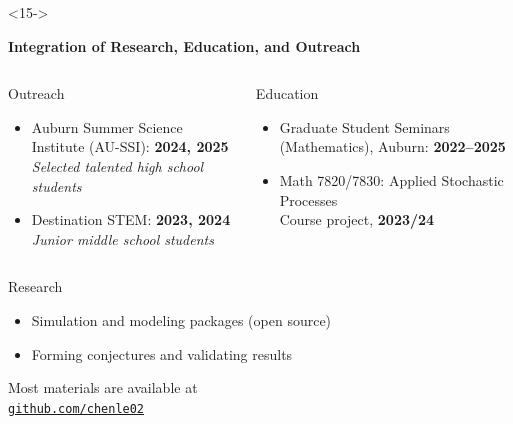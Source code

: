 \documentclass[9pt,table,xcolor=dvipsnames]{beamer}
\begin{document}
\begin{frame}[noframenumbering] %
  \titlepage
\end{frame}
\begin{frame}<15->%

  \begin{center}
    \textbf{Integration of Research, Education, and Outreach}
  \end{center}
  \vfill
  \small  %

  \begin{columns}[T,onlytextwidth]
    \begin{block}{Outreach}
      \begin{itemize}\itemsep4pt
        \item Auburn Summer Science Institute (AU-SSI): \textbf{2024, 2025} \\
              \emph{Selected talented high school students}
        \item Destination STEM: \textbf{2023, 2024}                         \\
              \emph{Junior middle school students}
      \end{itemize}
    \end{block}

    \begin{block}{Education}
      \begin{itemize}\itemsep2pt
        \item Graduate Student Seminars (Mathematics), Auburn: \textbf{2022--2025}
        \item Math 7820/7830: Applied Stochastic Processes \\
              Course project, \textbf{2023/24}
      \end{itemize}
    \end{block}

  \end{columns}
   \vfill 
   \begin{center}
      \begin{minipage}{0.35\textwidth}
        \begin{block}{Research}
          \begin{itemize}\itemsep2pt
            \item Simulation and modeling packages (open source)
            \item Forming conjectures and validating results
          \end{itemize}
        \end{block}
      \end{minipage}
   \end{center}
  \vfill

  \begin{center}
    Most materials are available at \\ \bigskip
    \href{https://github.com/chenle02/}{\texttt{github.com/chenle02}}%
  \end{center}
\end{frame}
\end{document}
